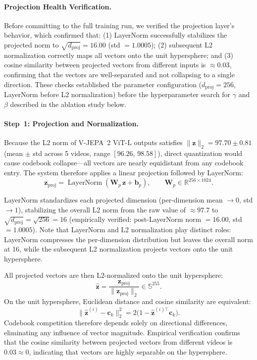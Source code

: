 \documentclass{article}
\begin{document}
\paragraph{Projection Health Verification.}
Before committing to the full training run, we verified the
projection layer's behavior,
which confirmed that: (1) LayerNorm successfully stabilizes the
projected norm to $\sqrt{d_{\text{proj}}} = 16.00$ (std $= 1.0005$);
(2) subsequent L2 normalization correctly maps all vectors onto the
unit hypersphere; and (3) cosine similarity between projected vectors
from different inputs is $\approx 0.03$, confirming that the vectors
are well-separated and not collapsing to a single direction.  These checks established the parameter configuration ($d_{\text{proj}} = 256$,
LayerNorm before L2 normalization) before the hyperparameter search for
$\gamma$ and $\beta$ described in the ablation study below.


 
\paragraph{Step~1: Projection and Normalization.}
Because the L2 norm of V-JEPA~2 ViT-L outputs satisfies
$\|\mathbf{z}\|_2 = 97.70 \pm 0.81$ (mean $\pm$ std across 5 videos,
range $[96.26,\,98.58]$), direct quantization would cause codebook
collapse---all vectors are nearly equidistant from any codebook entry.
The system therefore applies a linear projection followed by
LayerNorm:
%
\begin{equation}
  \mathbf{z}_{\text{proj}}
  = \operatorname{LayerNorm}(\mathbf{W}_p\,\mathbf{z} + \mathbf{b}_p),
  \qquad \mathbf{W}_p \in \mathbb{R}^{256 \times 1024}.
\end{equation}
%


LayerNorm standardizes each projected dimension (per-dimension mean $\to 0$,
std $\to 1$), stabilizing the overall L2 norm from the raw value of
$\approx\!97.7$ to $\sqrt{d_{\text{proj}}} = \sqrt{256} = 16$ (empirically
verified: post-LayerNorm norm $= 16.00$, std $= 1.0005$).  Note that LayerNorm
and L2 normalization play distinct roles: LayerNorm compresses the per-dimension
distribution but leaves the overall norm at 16, while the subsequent L2
normalization projects vectors onto the unit hypersphere.

All projected vectors are then L2-normalized onto the unit hypersphere:
%
\begin{equation}
  \hat{\mathbf{z}}
  = \frac{\mathbf{z}_{\text{proj}}}{\|\mathbf{z}_{\text{proj}}\|_2}
  \in \mathbb{S}^{255}.
\end{equation}
%
On the unit hypersphere, Euclidean distance and cosine similarity are
equivalent:
%
\begin{equation}
  \|\hat{\mathbf{z}}^{(i)} - \mathbf{c}_k\|_2^2
  = 2\bigl(1 - \hat{\mathbf{z}}^{(i)\top}\mathbf{c}_k\bigr).
\end{equation}
%
Codebook competition therefore depends solely on directional differences,
eliminating any influence of vector magnitude.  Empirical verification confirms
that the cosine similarity between projected vectors from different videos is
$0.03 \approx 0$, indicating that vectors are highly separable on the
hypersphere.
\end{document}
